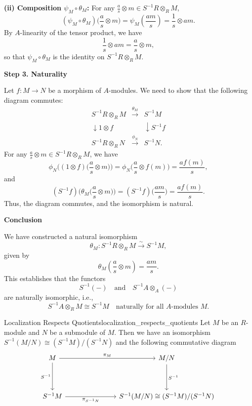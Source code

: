 \begin{prf}
\textbf{(ii) Composition \(\psi_M \circ \theta_M\):} For any \(\frac{a}{s} \otimes m \in S^{-1}R \otimes_R M\),
\[
(\psi_M \circ \theta_M)\Big(\frac{a}{s} \otimes m\Big) = \psi_M\left(\frac{am}{s}\right) = \frac{1}{s} \otimes am.
\]
By \(A\)-linearity of the tensor product, we have
\[
\frac{1}{s} \otimes am = \frac{a}{s} \otimes m,
\]
so that \(\psi_M \circ \theta_M\) is the identity on \(S^{-1}R \otimes_R M\).

\vspace{1em}
\textbf{Step 3. Naturality}

Let \(f: M \to N\) be a morphism of \(A\)-modules. We need to show that the following diagram commutes:
\[
\begin{array}{ccc}
S^{-1}R \otimes_R M & \xrightarrow{\theta_M} & S^{-1}M \\[1ex]
\downarrow{1\otimes f} &  & \downarrow{S^{-1}f} \\[1ex]
S^{-1}R \otimes_R N & \xrightarrow{\phi_N} & S^{-1}N.
\end{array}
\]
For any \(\frac{a}{s} \otimes m \in S^{-1}R \otimes_R M\), we have
\[
\phi_N\Big((1\otimes f)\Big(\frac{a}{s} \otimes m\Big)\Big) = \phi_N\Big(\frac{a}{s} \otimes f(m)\Big) = \frac{af(m)}{s},
\]
and
\[
(S^{-1}f)\Big(\theta_M\Big(\frac{a}{s} \otimes m\Big)\Big) = (S^{-1}f)\Big(\frac{am}{s}\Big) = \frac{af(m)}{s}.
\]
Thus, the diagram commutes, and the isomorphism is natural.

\vspace{1em}
\textbf{Conclusion}

We have constructed a natural isomorphism
\[
\theta_M: S^{-1}R \otimes_R M \xrightarrow{\sim} S^{-1}M,
\]
given by
\[
\theta_M\left(\frac{a}{s} \otimes m\right) = \frac{am}{s}.
\]
This establishes that the functors
\[
S^{-1}(-) \quad \text{and} \quad S^{-1}A\otimes_A(-)
\]
are naturally isomorphic, i.e.,
\[
\boxed{S^{-1}A\otimes_R M \cong S^{-1}M \quad \text{naturally for all } A\text{-modules } M.}
\]
\end{prf}


\begin{proposition}{Localization Respects Quotients}{localization_respects_quotients}
    Let $M$ be an $R$-module and $N$ be a submodule of $M$. Then we have an isomorphism $S^{-1}(M/N)\cong (S^{-1}M)/(S^{-1}N)$ and the following commutative diagram
    \[
        \begin{tikzcd}
            M \arrow[r, "\pi_M"] \arrow[d, "S^{-1}"'] &[+5em] M/N \arrow[d, "S^{-1}"]              \\[+2em]
            S^{-1}M \arrow[r, "\pi_{S^{-1}N}"']       & S^{-1}(M/N)\cong (S^{-1}M)/(S^{-1}N)
            \end{tikzcd}
    \]
\end{proposition}


